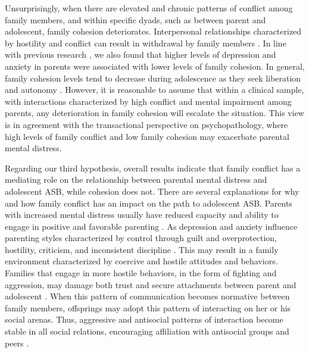 \documentclass{sn-jnl}                  %
\begin{document}
Unsurprisingly, when there are elevated and chronic patterns of conflict among family members, and within specific dyads, such as between parent and adolescent, family cohesion deteriorates. Interpersonal relationships characterized by hostility and conflict can result in withdrawal by family members \citep{romm:2022}. In line with previous research \citep{li:2021, vanloon:2014}, we also found that higher levels of depression and anxiety in parents were associated with lower levels of family cohesion. In general, family cohesion levels tend to decrease during adolescence as they seek liberation and autonomy \citep{baer:2002, lin:2019}. However, it is reasonable to assume that within a clinical sample, with interactions characterized by high conflict and mental impairment among parents, any deterioration in family cohesion will escalate the situation. This view is in agreement with the transactional perspective on psychopathology, where high levels of family conflict and low family cohesion may exacerbate parental mental distress.

Regarding our third hypothesis, overall results indicate that family conflict has a mediating role on the relationship between parental mental distress and adolescent ASB, while cohesion does not. There are several explanations for why and how family conflict has an impact on the path to adolescent ASB. Parents with increased mental distress usually have reduced capacity and ability to engage in positive and favorable parenting \citep{joyner:2021}. As depression and anxiety influence parenting styles characterized by control through guilt and overprotection, hostility, criticism, and inconsistent discipline \citep{cummings:2005, korhonen:2014}. This may result in a family environment characterized by coercive and hostile attitudes and behaviors. Families that engage in more hostile behaviors, in the form of fighting and aggression, may damage both trust and secure attachments between parent and adolescent \citep{buehler:2006, weymouth:2016}. When this pattern of communication becomes normative between family members, offsprings may adopt this pattern of interacting on her or his social arenas. Thus, aggressive and antisocial patterns of interaction become stable in all social relations, encouraging affiliation with antisocial groups and peers \citep{carroll:2009, moffitt:2015}.
\end{document}
